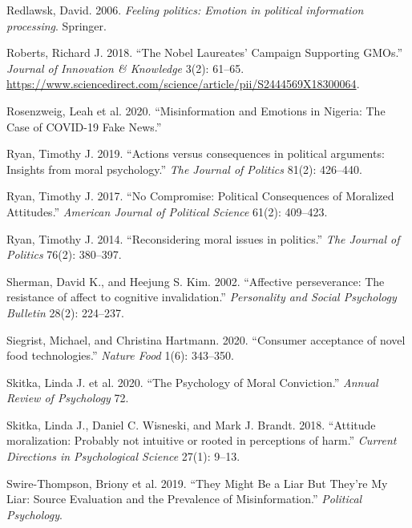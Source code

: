 \documentclass[
  12pt,
]{article}
\begin{document}
\leavevmode\hypertarget{ref-redlawsk2006feeling}{}%
Redlawsk, David. 2006. \emph{Feeling politics: Emotion in political information processing}. Springer.

\leavevmode\hypertarget{ref-roberts2018nobel}{}%
Roberts, Richard J. 2018. ``The Nobel Laureates' Campaign Supporting GMOs.'' \emph{Journal of Innovation \& Knowledge} 3(2): 61--65. \url{https://www.sciencedirect.com/science/article/pii/S2444569X18300064}.

\leavevmode\hypertarget{ref-rosenzweig2020misinformation}{}%
Rosenzweig, Leah et al. 2020. ``Misinformation and Emotions in Nigeria: The Case of COVID-19 Fake News.''

\leavevmode\hypertarget{ref-ryan2019actions}{}%
Ryan, Timothy J. 2019. ``Actions versus consequences in political arguments: Insights from moral psychology.'' \emph{The Journal of Politics} 81(2): 426--440.

\leavevmode\hypertarget{ref-ryan2017no}{}%
Ryan, Timothy J. 2017. ``No Compromise: Political Consequences of Moralized Attitudes.'' \emph{American Journal of Political Science} 61(2): 409--423.

\leavevmode\hypertarget{ref-ryan2014reconsidering}{}%
Ryan, Timothy J. 2014. ``Reconsidering moral issues in politics.'' \emph{The Journal of Politics} 76(2): 380--397.

\leavevmode\hypertarget{ref-sherman2002affective}{}%
Sherman, David K., and Heejung S. Kim. 2002. ``Affective perseverance: The resistance of affect to cognitive invalidation.'' \emph{Personality and Social Psychology Bulletin} 28(2): 224--237.

\leavevmode\hypertarget{ref-siegrist2020consumer}{}%
Siegrist, Michael, and Christina Hartmann. 2020. ``Consumer acceptance of novel food technologies.'' \emph{Nature Food} 1(6): 343--350.

\leavevmode\hypertarget{ref-skitka2020psychology}{}%
Skitka, Linda J. et al. 2020. ``The Psychology of Moral Conviction.'' \emph{Annual Review of Psychology} 72.

\leavevmode\hypertarget{ref-skitka2018attitude}{}%
Skitka, Linda J., Daniel C. Wisneski, and Mark J. Brandt. 2018. ``Attitude moralization: Probably not intuitive or rooted in perceptions of harm.'' \emph{Current Directions in Psychological Science} 27(1): 9--13.

\leavevmode\hypertarget{ref-swire2019they}{}%
Swire-Thompson, Briony et al. 2019. ``They Might Be a Liar But They're My Liar: Source Evaluation and the Prevalence of Misinformation.'' \emph{Political Psychology}.
\end{document}

